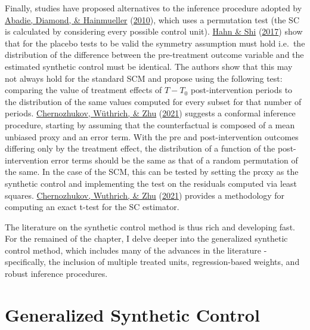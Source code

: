 \documentclass[12pt,nobind, a4paper]{reedthesis}
\begin{document}
 Finally, studies have proposed alternatives to the inference procedure adopted by \protect\hyperlink{ref-abadie_synthetic_2010}{Abadie, Diamond, \& Hainmueller} (\protect\hyperlink{ref-abadie_synthetic_2010}{2010}), which uses a permutation test (the SC is calculated by considering every possible control unit). \protect\hyperlink{ref-hahn_synthetic_2017}{Hahn \& Shi} (\protect\hyperlink{ref-hahn_synthetic_2017}{2017}) show that for the placebo tests to be valid the symmetry assumption must hold i.e.~the distribution of the difference between the pre-treatment outcome variable and the estimated synthetic control must be identical. The authors show that this may not always hold for the standard SCM and propose using the following test: comparing the value of treatment effects of \(T-T_{0}\) post-intervention periods to the distribution of the same values computed for every subset for that number of periods. \protect\hyperlink{ref-chernozhukov_exact_2021}{Chernozhukov, Wüthrich, \& Zhu} (\protect\hyperlink{ref-chernozhukov_exact_2021}{2021}) suggests a conformal inference procedure, starting by assuming that the counterfactual is composed of a mean unbiased proxy and an error term. With the pre and post-intervention outcomes differing only by the treatment effect, the distribution of a function of the post-intervention error terms should be the same as that of a random permutation of the same. In the case of the SCM, this can be tested by setting the proxy as the synthetic control and implementing the test on the residuals computed via least squares. \protect\hyperlink{ref-chernozhukov_t-test_2021}{Chernozhukov, Wuthrich, \& Zhu} (\protect\hyperlink{ref-chernozhukov_t-test_2021}{2021}) provides a methodology for computing an exact t-test for the SC estimator.
 \linebreak

 The literature on the synthetic control method is thus rich and developing fast. For the remained of the chapter, I delve deeper into the generalized synthetic control method, which includes many of the advances in the literature - specifically, the inclusion of multiple treated units, regression-based weights, and robust inference procedures.

 \hypertarget{generalized-synthetic-control}{%
 \section{Generalized Synthetic Control}\label{generalized-synthetic-control}}
\end{document}
